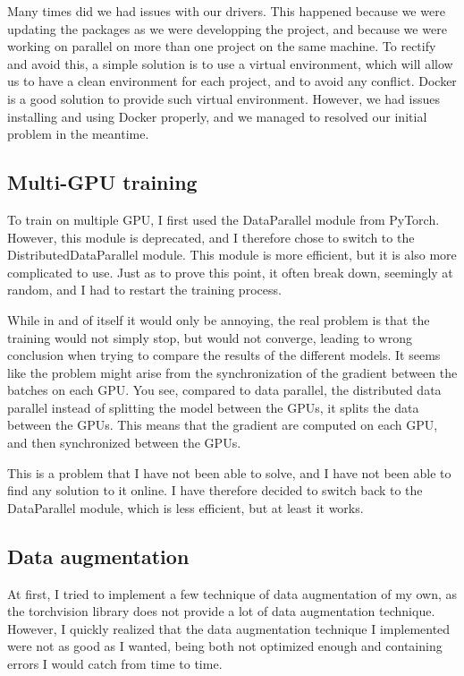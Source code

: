 \documentclass[11pt]{article}
\begin{document}
        Many times did we had issues with our drivers. This happened because we were updating the packages as we were developping the project, and because we were working on parallel on more than one project
        on the same machine. To rectify and avoid this, a simple solution is to use a virtual environment, which will allow us to have a clean environment for each project, and to avoid any conflict. Docker
        is a good solution to provide such virtual environment. However, we had issues installing and using Docker properly, and we managed to resolved our initial problem in the meantime.

    \subsection{Multi-GPU training}

        To train on multiple GPU, I first used the DataParallel module from PyTorch. However, this module is deprecated, and I therefore chose to switch to the DistributedDataParallel module. This module is more efficient, but it is also more complicated to use.
        Just as to prove this point, it often break down, seemingly at random, and I had to restart the training process.

        While in and of itself it would only be annoying, the real problem is that the training would not simply stop, but would not converge, leading to
        wrong conclusion when trying to compare the results of the different models. It seems like the problem might arise from the synchronization of the
        gradient between the batches on each GPU. You see, compared to data parallel, the distributed data parallel instead of splitting the model between the GPUs, it splits the data between the GPUs.
        This means that the gradient are computed on each GPU, and then synchronized between the GPUs.

        This is a problem that I have not been able to solve, and I have not been able to find any solution to it online. I have therefore decided to switch back to the DataParallel module, which is less efficient, but at least it works.


    \subsection{Data augmentation}


        At first, I tried to implement a few technique of data augmentation of my own, as the torchvision library does not provide a lot of data augmentation technique.
        However, I quickly realized that the data augmentation technique I implemented were not as good as I wanted, being both not optimized enough and containing errors I would catch from time to time.
\end{document}

